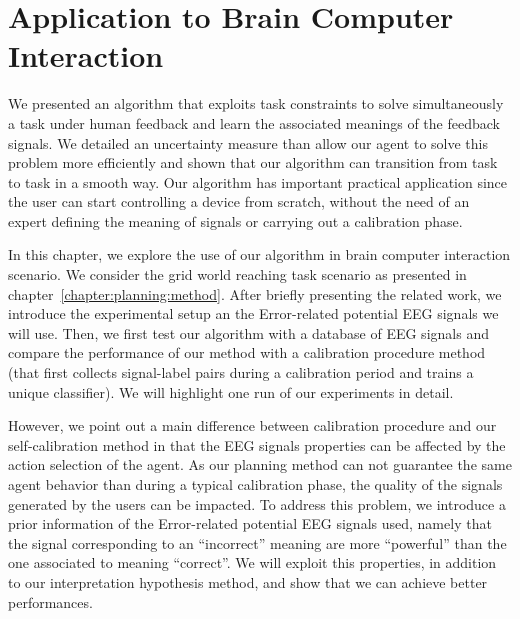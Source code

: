 
\chapter{Application to Brain Computer Interaction}
\label{chapter:bci}
\minitoc

We presented an algorithm that exploits task constraints to solve simultaneously a task under human feedback and learn the associated meanings of the feedback signals. We detailed an uncertainty measure than allow our agent to solve this problem more efficiently and shown that our algorithm can transition from task to task in a smooth way. Our algorithm has important practical application since the user can start controlling a device from scratch, without the need of an expert defining the meaning of signals or carrying out a calibration phase. 

In this chapter, we explore the use of our algorithm in brain computer interaction scenario. We consider the grid world reaching task scenario as presented in chapter~\ref{chapter:planning:method}. After briefly presenting the related work, we introduce the experimental setup an the Error-related potential EEG signals we will use. Then, we first test our algorithm with a database of EEG signals and compare the performance of our method with a calibration procedure method (that first collects signal-label pairs during a calibration period and trains a unique classifier). We will highlight one run of our experiments in detail.


However, we point out a main difference between calibration procedure and our self-calibration method in that the EEG signals properties can be affected by the action selection of the agent. As our planning method can not guarantee the same agent behavior than during a typical calibration phase, the quality of the signals generated by the users can be impacted. To address this problem, we introduce a prior information of the Error-related potential EEG signals used, namely that the signal corresponding to an ``incorrect'' meaning are more ``powerful'' than the one associated to meaning ``correct''. We will exploit this properties, in addition to our interpretation hypothesis method, and show that we can achieve better performances. 

